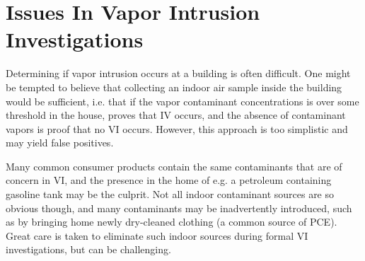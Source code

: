\begin{comment}
Purpose is to demonstrate the issues that temporal and spatial variability causes in VI site investigations, and impress upon the reader the necessity to solve these.

- State the general issues, i.e. harder to assess real human exposure, more expensive, etc.
- Give examples in the literature and describe the situation. (1-2 examples for spatial/temporal respectively should suffice.)

Topics to cover:

Issues that confound VI investigations:
* Indoor sources/false positives (problem with only indoor samples)
* Sub-surface contaminant formation by indoor (sub-surface samples)
* Groundwater samples (spatial variability & presence of contaminants here does not mean entry occurs)
* Issues with preferential pathways
  * Indie style (long distance transport of contaminants)
  * Kelly style (plumbing fixtures)
  * ASU style (+ Danish study?) (nearby sub surface features that are not readily apparent)
* Seasonal aspect
* Necessity of MLE
  * Expensive and hard
  * Need for more robust methods

\end{comment}

\section{Issues In Vapor Intrusion Investigations}

Determining if vapor intrusion occurs at a building is often difficult.
One might be tempted to believe that collecting an indoor air sample inside the building would be sufficient, i.e. that if the vapor contaminant concentrations is over some threshold in the house, proves that IV occurs, and the absence of contaminant vapors is proof that no VI occurs.
However, this approach is too simplistic and may yield false positives.\par %

Many common consumer products contain the same contaminants that are of concern in VI, and the presence in the home of e.g. a petroleum containing gasoline tank may be the culprit.
Not all indoor contaminant sources are so obvious though, and many contaminants may be inadvertently introduced, such as by bringing home newly dry-cleaned clothing (a common source of PCE).
Great care is taken to eliminate such indoor sources during formal VI investigations, but can be challenging.\par %

